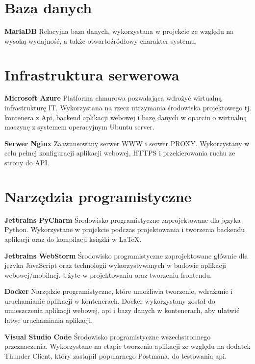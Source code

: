 \section{Baza danych}

\textbf{MariaDB} Relacyjna baza danych, wykorzystana w projekcie ze względu na
wysoką wydajność, a także otwartoźródłowy charakter systemu.

\section{Infrastruktura serwerowa}

\textbf{Microsoft Azure} Platforma chmurowa pozwalająca wdrożyć wirtualną infrastrukturę IT. Wykorzystana na rzecz utrzymania środowiska projektowego tj. kontenera z Api, backend aplikacji webowej i bazę danych w oparciu o wirtualną maszynę z systemem operacyjnym Ubuntu server.

\textbf{Serwer Nginx} Zaawansowany serwer WWW i serwer PROXY. Wykorzystany w celu pełnej konfiguracji aplikacji webowej, HTTPS i przekierowania ruchu ze strony do API.

\section{Narzędzia programistyczne}

\textbf{Jetbrains PyCharm} Środowisko programistyczne zaprojektowane dla języka Python. Wykorzystane w projekcie podczas projektowania i tworzenia backendu aplikacji oraz do kompilacji książki w LaTeX.

\medskip

\textbf{Jetbrains WebStorm} Środowisko programistyczne zaprojektowane głównie dla języka JavaScript oraz technologii wykorzystywanych w budowie aplikacji webowej/mobilnej. Użyte w projektowaniu oraz tworzeniu frontendu.

\medskip

\textbf{Docker} Narzędzie programistyczne, które umożliwia tworzenie, wdrażanie i uruchamianie aplikacji w kontenerach. Docker wykorzystany został do umieszczenia aplikacji webowej, api i bazy danych w kontenerach, aby ułatwić łatwe uruchamiania aplikacji.

\medskip

\textbf{Visual Studio Code} Środowisko programistyczne wszechstronnego przeznaczenia. Wykorzystane na etapie tworzenia aplikacji ze względu na dodatek Thunder Client, który zastąpił popularnego Postmana, do testowania api.

